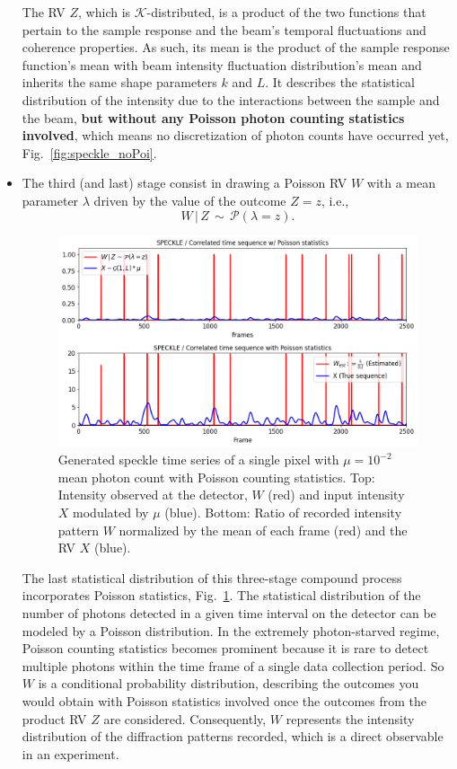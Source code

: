\documentclass[11pt]{article}
\theoremstyle{definition}
\begin{document}
\begin{itemize}
The RV \(Z\), which is \(\mathcal{K}\)-distributed, is a product of the two functions that pertain to the sample response and the beam's temporal fluctuations and coherence properties. As such, its mean is the product of the sample response function's mean with beam intensity fluctuation distribution's mean and inherits the same shape parameters $k$ and $L$. It describes the statistical distribution of the intensity due to the interactions between the sample and the beam, \textbf{but without any Poisson photon counting statistics involved}, which means no discretization of photon counts have occurred yet, Fig.~\ref{fig:speckle_noPoi}. 
%
\item The third (and last) stage consist in drawing a Poisson RV $W$ with a mean parameter $\lambda$ driven by the value of the outcome $Z=z$, i.e.,
%
\begin{equation}
W \,|\, Z   \, \sim \, \mathcal{P}(\lambda = z).  
\label{PDF_Z|Y}
\end{equation}
%
\begin{figure}[h!]
    \centering
    \includegraphics[width=120mm]{figures/speckle_poi_newlegend.png}
    \caption{Generated speckle time series of a single pixel with \(\mu = 10^{-2}\) mean photon count with Poisson counting statistics. Top: Intensity observed at the detector, \(W\) (red) and input intensity \(X\) modulated by \(\mu\) (blue). Bottom: Ratio of recorded intensity pattern \(W\) normalized by the mean of each frame (red) and the RV \(X\) (blue).}
    \label{fig:speckle_Poi}
\end{figure}
The last statistical distribution of this three-stage compound process incorporates Poisson statistics, Fig.~\ref{fig:speckle_Poi}. The statistical distribution of the number of photons detected in a given time interval on the detector can be modeled by a Poisson distribution. In the extremely photon-starved regime, Poisson counting statistics becomes prominent because it is rare to detect multiple photons within the time frame of a single data collection period. 
So \(W\) is a conditional probability distribution, describing the outcomes you would obtain with Poisson statistics involved once the outcomes from the product RV \(Z\) are considered. Consequently, \(W\) represents the intensity distribution of the diffraction patterns recorded, which is a direct observable in an experiment. 
\end{itemize}
\end{document}

